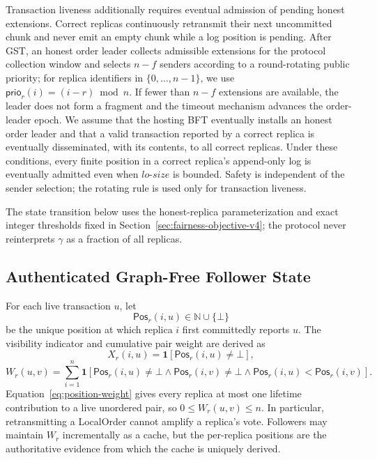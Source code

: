 Transaction liveness additionally requires eventual admission of pending
honest extensions.  Correct replicas continuously retransmit their next
uncommitted chunk and never emit an empty chunk while a log position is
pending.  After GST, an honest order leader collects admissible extensions for
the protocol collection window and selects $n-f$ senders according to a
round-rotating public priority; for replica identifiers in
$\{0,\ldots,n-1\}$, we use
$\mathsf{prio}_r(i)=(i-r)\bmod n$.  If fewer than $n-f$ extensions are
available, the leader does not form a fragment and the timeout mechanism
advances the order-leader epoch.  We assume that the hosting BFT eventually
installs an honest order leader and that a valid transaction reported by a
correct replica is eventually disseminated, with its contents, to all correct
replicas.  Under these conditions, every finite position in a correct
replica's append-only log is eventually admitted even when $lo\text{-}size$
is bounded.  Safety is independent of the sender selection; the rotating rule
is used only for transaction liveness.

The state transition below uses the honest-replica parameterization and exact
integer thresholds fixed in Section~\ref{sec:fairness-objective-v4}; the
protocol never reinterprets $\gamma$ as a fraction of all replicas.

\subsection{Authenticated Graph-Free Follower State}
\label{sec:authenticated-evidence-state-v4}

For each live transaction $u$, let
\[
 \mathsf{Pos}_r(i,u)\in\mathbb N\cup\{\bot\}
\]
be the unique position at which replica $i$ first committedly reports $u$.
The visibility indicator and cumulative pair weight are derived as
\[
 X_r(i,u)=\mathbf 1[\mathsf{Pos}_r(i,u)\ne\bot],
\]
\[
 W_r(u,v)=\sum_{i=1}^{n}
 \mathbf 1[\mathsf{Pos}_r(i,u)\ne\bot\land
            \mathsf{Pos}_r(i,v)\ne\bot\land
            \mathsf{Pos}_r(i,u)<\mathsf{Pos}_r(i,v)].
 \tag{5}\label{eq:position-weight}
\]
Equation~\eqref{eq:position-weight} gives every replica at most one lifetime
contribution to a live unordered pair, so $0\le W_r(u,v)\le n$.  In
particular, retransmitting a LocalOrder cannot amplify a replica's vote.
Followers may maintain $W_r$ incrementally as a cache, but the per-replica
positions are the authoritative evidence from which the cache is uniquely
derived.

